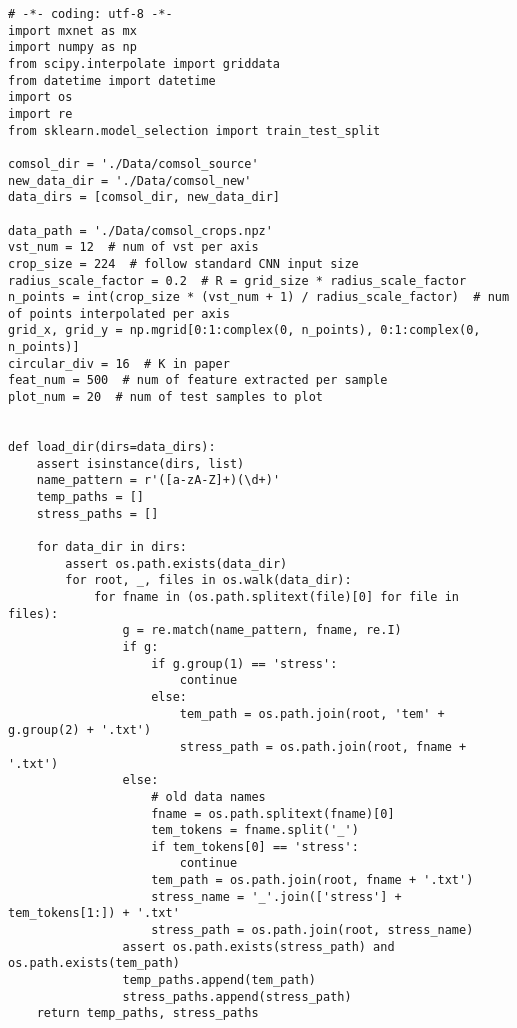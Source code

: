 \begin{verbatim}
# -*- coding: utf-8 -*-
import mxnet as mx
import numpy as np
from scipy.interpolate import griddata
from datetime import datetime
import os
import re
from sklearn.model_selection import train_test_split

comsol_dir = './Data/comsol_source'
new_data_dir = './Data/comsol_new'
data_dirs = [comsol_dir, new_data_dir]

data_path = './Data/comsol_crops.npz'
vst_num = 12  # num of vst per axis
crop_size = 224  # follow standard CNN input size
radius_scale_factor = 0.2  # R = grid_size * radius_scale_factor
n_points = int(crop_size * (vst_num + 1) / radius_scale_factor)  # num of points interpolated per axis
grid_x, grid_y = np.mgrid[0:1:complex(0, n_points), 0:1:complex(0, n_points)]
circular_div = 16  # K in paper
feat_num = 500  # num of feature extracted per sample
plot_num = 20  # num of test samples to plot


def load_dir(dirs=data_dirs):
    assert isinstance(dirs, list)
    name_pattern = r'([a-zA-Z]+)(\d+)'
    temp_paths = []
    stress_paths = []
    
    for data_dir in dirs:
        assert os.path.exists(data_dir)
        for root, _, files in os.walk(data_dir):
            for fname in (os.path.splitext(file)[0] for file in files):
                g = re.match(name_pattern, fname, re.I)
                if g:
                    if g.group(1) == 'stress':
                        continue
                    else:
                        tem_path = os.path.join(root, 'tem' + g.group(2) + '.txt')
                        stress_path = os.path.join(root, fname + '.txt')
                else:
                    # old data names
                    fname = os.path.splitext(fname)[0]
                    tem_tokens = fname.split('_')
                    if tem_tokens[0] == 'stress':
                        continue
                    tem_path = os.path.join(root, fname + '.txt')
                    stress_name = '_'.join(['stress'] + tem_tokens[1:]) + '.txt'
                    stress_path = os.path.join(root, stress_name)
                assert os.path.exists(stress_path) and os.path.exists(tem_path)
                temp_paths.append(tem_path)
                stress_paths.append(stress_path)
    return temp_paths, stress_paths



\end{verbatim}
